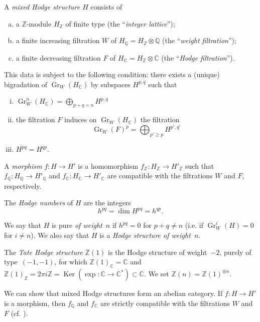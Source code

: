 \documentclass{article}
\theoremstyle{plain}
\theoremstyle{definition}
\newenvironment{definition}[1]
    {\renewcommand\theinnercustomdefinition{#1}\innercustomdefinition}
    {\endinnercustomdefinition}
\newcommand{\ZZ}{\mathbb{Z}}
\newcommand{\QQ}{\mathbb{Q}}
\newcommand{\CC}{\mathbb{C}}
\DeclareMathOperator{\Gr}{Gr}
\DeclareMathOperator{\Ker}{Ker}
\renewcommand{\geq}{\geqslant}
\begin{document}
\begin{definition}{1.1}
  A \emph{mixed Hodge structure $H$} consists of
  \begin{enumerate}[(a)]
    \item a $\ZZ$-module $H_\ZZ$ of finite type (the ``\emph{integer lattice}'');
    \item a finite increasing filtration $W$ of $H_\QQ = H_\ZZ\otimes\QQ$ (the ``\emph{weight filtration}'');
    \item a finite decreasing filtration $F$ of $H_\CC = H_\ZZ\otimes\CC$ (the ``\emph{Hodge filtration}'').
  \end{enumerate}
  This data is subject to the following condition:
  there exists a (unique) bigradation of $\Gr_W(H_\CC)$ by subspaces $H^{p,q}$ such that
  \begin{enumerate}[(i)]
    \item $\Gr_W^n(H_\CC) = \bigoplus_{p+q=n}H^{p,q}$
    \item the filtration $F$ induces on $\Gr_W(H_\CC)$ the filtration
      \[
        \Gr_W(F)^p = \bigoplus_{p'\geq p} H^{p',q'}
      \]
    \item $\overline{H^{pq}}=H^{qp}$.
  \end{enumerate}
\end{definition}

A \emph{morphism} $f\colon H\to H'$ is a homomorphism $f_\ZZ\colon H_\ZZ\to H'_\ZZ$ such that $f_\QQ\colon H_\QQ\to H'_\QQ$ and $f_\CC\colon H_\CC\to H'_\CC$ are compatible with the filtrations $W$ and $F$, respectively.

The \emph{Hodge numbers} of $H$ are the integers
\[
  h^{pq} = \dim H^{pq} = h^{qp}.
\tag{1.2}
\]

We say that $H$ is pure \emph{of weight~$n$} if $h^{pq}=0$ for $p+q\neq n$ (i.e. if $\Gr_W^i(H)=0$ for $i\neq n$).
We also say that $H$ is a \emph{Hodge structure of weight~$n$}.

The \emph{Tate Hodge structure} $\ZZ(1)$ is the Hodge structure of weight~$-2$, purely of type~$(-1,-1)$, for which $\ZZ(1)_\CC=\CC$ and $\ZZ(1)_\ZZ = 2\pi i\ZZ = \Ker(\exp\colon\CC\to\CC^*)\subset\CC$.
We set $\ZZ(n)=\ZZ(1)^{\otimes n}$.

We can show that mixed Hodge structures form an abelian category.
If $f\colon H\to H'$ is a morphism, then $f_\QQ$ and $f_\CC$ are strictly compatible with the filtrations $W$ and $F$ (cf. \cite[2.3.5]{1}).


\section{}
\label{2}
\end{document}
